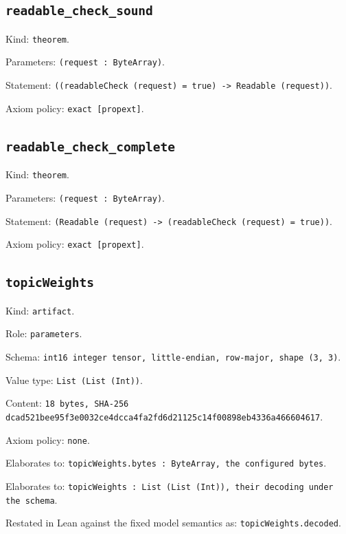 \documentclass[11pt]{article}
\begin{document}
\subsection*{\texttt{readable\_check\_sound}}
\noindent Kind: \texttt{theorem}.\par
\noindent Parameters: \texttt{(request : ByteArray)}.\par
\noindent Statement: \texttt{((readableCheck (request) = true) -> Readable (request))}.\par
\noindent Axiom policy: \texttt{exact [propext]}.\par
\subsection*{\texttt{readable\_check\_complete}}
\noindent Kind: \texttt{theorem}.\par
\noindent Parameters: \texttt{(request : ByteArray)}.\par
\noindent Statement: \texttt{(Readable (request) -> (readableCheck (request) = true))}.\par
\noindent Axiom policy: \texttt{exact [propext]}.\par
\subsection*{\texttt{topicWeights}}
\noindent Kind: \texttt{artifact}.\par
\noindent Role: \texttt{parameters}.\par
\noindent Schema: \texttt{int16 integer tensor, little-endian, row-major, shape (3, 3)}.\par
\noindent Value type: \texttt{List (List (Int))}.\par
\noindent Content: \texttt{18 bytes, SHA-256 dcad521bee95f3e0032ce4dcca4fa2fd6d21125c14f00898eb4336a466604617}.\par
\noindent Axiom policy: \texttt{none}.\par
\noindent Elaborates to: \texttt{topicWeights.bytes : ByteArray, the configured bytes}.\par
\noindent Elaborates to: \texttt{topicWeights : List (List (Int)), their decoding under the schema}.\par
\noindent Restated in Lean against the fixed model semantics as: \texttt{topicWeights.decoded}.\par
\end{document}
